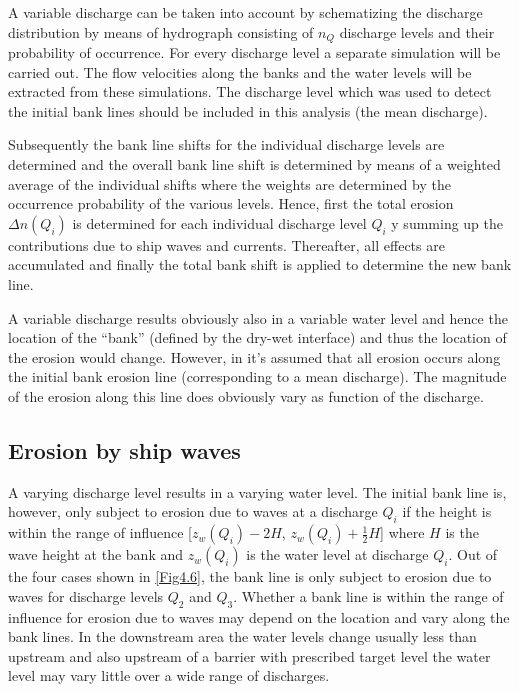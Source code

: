 A variable discharge can be taken into account by schematizing the discharge distribution by means of hydrograph consisting of $n_Q$ discharge levels and their probability of occurrence.
For every discharge level a separate \dflowfm simulation will be carried out.
The flow velocities along the banks and the water levels will be extracted from these simulations.
The discharge level which was used to detect the initial bank lines should be included in this analysis (the mean discharge).

Subsequently the bank line shifts for the individual discharge levels are determined and the overall bank line shift is determined by means of a weighted average of the individual shifts where the weights are determined by the occurrence probability of the various levels.
Hence, first the total erosion $\Delta n ( Q_i )$ is determined for each individual discharge level $Q_i$ y summing up the contributions due to ship waves and currents.
Thereafter, all effects are accumulated and finally the total bank shift is applied to determine the new bank line.

A variable discharge results obviously also in a variable water level and hence the location of the ``bank'' (defined by the dry-wet interface) and thus the location of the erosion would change.
However, in \dfastbe it's assumed that all erosion occurs along the initial bank erosion line (corresponding to a mean discharge).
The magnitude of the erosion along this line does obviously vary as function of the discharge.

\subsection{Erosion by ship waves}

A varying discharge level results in a varying water level.
The initial bank line is, however, only subject to erosion due to waves at a discharge $Q_i$ if the height is within the range of influence [$z_w(Q_i) - 2 H$, $z_w(Q_i) + \frac{1}{2} H$] where $H$ is the wave height at the bank and $z_w(Q_i)$ is the water level at discharge $Q_i$.
Out of the four cases shown in \autoref{Fig4.6}, the bank line is only subject to erosion due to waves for discharge levels $Q_2$ and $Q_3$.
Whether a bank line is within the range of influence for erosion due to waves may depend on the location and vary along the bank lines.
In the downstream area the water levels change usually less than upstream and also upstream of a barrier with prescribed target level the water level may vary little over a wide range of discharges.

